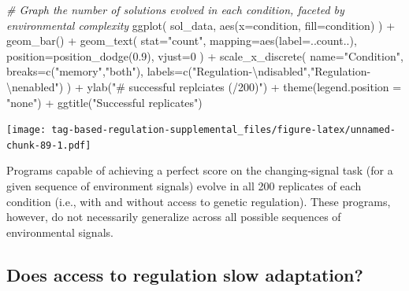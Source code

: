 \documentclass[
]{book}
\newenvironment{Shaded}{\begin{snugshade}}{\end{snugshade}}
\newcommand{\AttributeTok}[1]{\textcolor[rgb]{0.77,0.63,0.00}{#1}}
\newcommand{\CommentTok}[1]{\textcolor[rgb]{0.56,0.35,0.01}{\textit{#1}}}
\newcommand{\DecValTok}[1]{\textcolor[rgb]{0.00,0.00,0.81}{#1}}
\newcommand{\FloatTok}[1]{\textcolor[rgb]{0.00,0.00,0.81}{#1}}
\newcommand{\FunctionTok}[1]{\textcolor[rgb]{0.00,0.00,0.00}{#1}}
\newcommand{\NormalTok}[1]{#1}
\newcommand{\SpecialCharTok}[1]{\textcolor[rgb]{0.00,0.00,0.00}{#1}}
\newcommand{\StringTok}[1]{\textcolor[rgb]{0.31,0.60,0.02}{#1}}
\begin{document}
\begin{Shaded}
\begin{Highlighting}[]
\CommentTok{\# Graph the number of solutions evolved in each condition, faceted by environmental complexity}
\FunctionTok{ggplot}\NormalTok{( sol\_data, }\FunctionTok{aes}\NormalTok{(}\AttributeTok{x=}\NormalTok{condition, }\AttributeTok{fill=}\NormalTok{condition) ) }\SpecialCharTok{+}
  \FunctionTok{geom\_bar}\NormalTok{() }\SpecialCharTok{+}
  \FunctionTok{geom\_text}\NormalTok{(}
    \AttributeTok{stat=}\StringTok{"count"}\NormalTok{,}
    \AttributeTok{mapping=}\FunctionTok{aes}\NormalTok{(}\AttributeTok{label=}\NormalTok{..count..),}
    \AttributeTok{position=}\FunctionTok{position\_dodge}\NormalTok{(}\FloatTok{0.9}\NormalTok{),}
    \AttributeTok{vjust=}\DecValTok{0}
\NormalTok{  ) }\SpecialCharTok{+}
  \FunctionTok{scale\_x\_discrete}\NormalTok{(}
    \AttributeTok{name=}\StringTok{"Condition"}\NormalTok{,}
    \AttributeTok{breaks=}\FunctionTok{c}\NormalTok{(}\StringTok{"memory"}\NormalTok{,}\StringTok{"both"}\NormalTok{),}
    \AttributeTok{labels=}\FunctionTok{c}\NormalTok{(}\StringTok{"Regulation{-}}\SpecialCharTok{\textbackslash{}n}\StringTok{disabled"}\NormalTok{,}\StringTok{"Regulation{-}}\SpecialCharTok{\textbackslash{}n}\StringTok{enabled"}\NormalTok{)}
\NormalTok{  ) }\SpecialCharTok{+}
  \FunctionTok{ylab}\NormalTok{(}\StringTok{"\# successful replciates (/200)"}\NormalTok{) }\SpecialCharTok{+}
  \FunctionTok{theme}\NormalTok{(}\AttributeTok{legend.position =} \StringTok{"none"}\NormalTok{) }\SpecialCharTok{+}
  \FunctionTok{ggtitle}\NormalTok{(}\StringTok{"Successful replicates"}\NormalTok{)}
\end{Highlighting}
\end{Shaded}

\texttt{[image: tag-based-regulation-supplemental\_files/figure-latex/unnamed-chunk-89-1.pdf]}

Programs capable of achieving a perfect score on the changing-signal task (for a given sequence of environment signals) evolve in all 200 replicates of each condition (i.e., with and without access to genetic regulation).
These programs, however, do not necessarily generalize across all possible sequences of environmental signals.

\hypertarget{does-access-to-regulation-slow-adaptation}{%
\subsection{Does access to regulation slow adaptation?}\label{does-access-to-regulation-slow-adaptation}}
\end{document}
